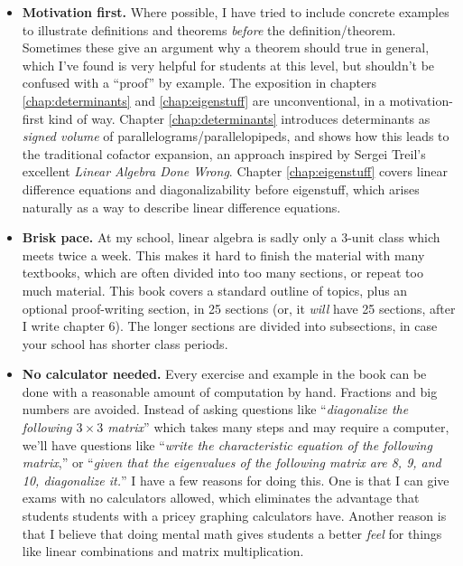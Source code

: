 \documentclass[11pt, letterpaper]{report}
\newcounter{exercise}[section]
\newcounter{example}[section]
\newcounter{theorem}[chapter]
\begin{document}
\begin{itemize}
\item \textbf{Motivation first.} Where possible, I have tried to include concrete examples to illustrate definitions and theorems \emph{before} the definition/theorem. Sometimes these give an argument why a theorem should true in general, which I've found is very helpful for students at this level, but shouldn't be confused with a ``proof'' by example. The exposition in chapters \ref{chap:determinants} and \ref{chap:eigenstuff} are unconventional, in a motivation-first kind of way. Chapter \ref{chap:determinants} introduces determinants as \emph{signed volume} of parallelograms/parallelopipeds, and shows how this leads to the traditional cofactor expansion, an approach inspired by Sergei Treil's excellent \emph{Linear Algebra Done Wrong}. Chapter \ref{chap:eigenstuff} covers linear difference equations and diagonalizability before eigenstuff, which arises naturally as a way to describe linear difference equations.
\item \textbf{Brisk pace.} At my school, linear algebra is sadly only a 3-unit class which meets twice a week. This makes it hard to finish the material with many textbooks, which are often divided into too many sections, or repeat too much material. This book covers a standard outline of topics, plus an optional proof-writing section, in 25 sections (or, it \emph{will} have 25 sections, after I write chapter 6). The longer sections are divided into subsections, in case your school has shorter class periods.
\item \textbf{No calculator needed.} Every exercise and example in the book can be done with a reasonable amount of computation by hand. Fractions and big numbers are avoided. Instead of asking questions like ``\emph{diagonalize the following $3\times 3$ matrix}'' which takes many steps and may require a computer, we'll have questions like ``\emph{write the characteristic equation of the following matrix},'' or ``\emph{given that the eigenvalues of the following matrix are 8, 9, and 10, diagonalize it.}'' I have a few reasons for doing this. One is that I can give exams with no calculators allowed, which eliminates the advantage that students students with a pricey graphing calculators have. Another reason is that I believe that doing mental math gives students a better \emph{feel} for things like linear combinations and matrix multiplication. 
\end{itemize}
\end{document}
